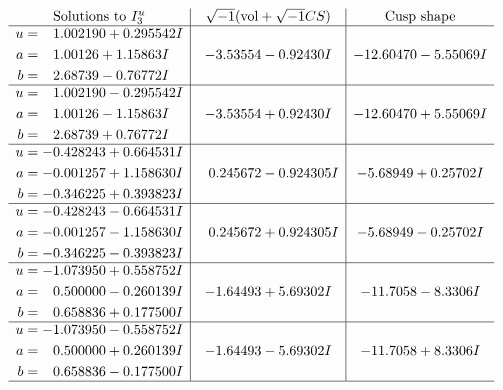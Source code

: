 \documentclass[1p]{elsarticle_modified}
\theoremstyle{definition}
\newcommand{\I}{\sqrt{-1}}
\begin{document}
$$\begin{array}{c|c|c}  
\text{Solutions to }I^u_{3}& \I (\text{vol} + \sqrt{-1}CS) & \text{Cusp shape}\\
 \hline 
\begin{aligned}
u &= \phantom{-}1.002190 + 0.295542 I \\
a &= \phantom{-}1.00126 + 1.15863 I \\
b &= \phantom{-}2.68739 - 0.76772 I\end{aligned}
 & -3.53554 - 0.92430 I & -12.60470 - 5.55069 I \\ \hline\begin{aligned}
u &= \phantom{-}1.002190 - 0.295542 I \\
a &= \phantom{-}1.00126 - 1.15863 I \\
b &= \phantom{-}2.68739 + 0.76772 I\end{aligned}
 & -3.53554 + 0.92430 I & -12.60470 + 5.55069 I \\ \hline\begin{aligned}
u &= -0.428243 + 0.664531 I \\
a &= -0.001257 + 1.158630 I \\
b &= -0.346225 + 0.393823 I\end{aligned}
 & \phantom{-}0.245672 - 0.924305 I & -5.68949 + 0.25702 I \\ \hline\begin{aligned}
u &= -0.428243 - 0.664531 I \\
a &= -0.001257 - 1.158630 I \\
b &= -0.346225 - 0.393823 I\end{aligned}
 & \phantom{-}0.245672 + 0.924305 I & -5.68949 - 0.25702 I \\ \hline\begin{aligned}
u &= -1.073950 + 0.558752 I \\
a &= \phantom{-}0.500000 - 0.260139 I \\
b &= \phantom{-}0.658836 + 0.177500 I\end{aligned}
 & -1.64493 + 5.69302 I & -11.7058 - 8.3306 I \\ \hline\begin{aligned}
u &= -1.073950 - 0.558752 I \\
a &= \phantom{-}0.500000 + 0.260139 I \\
b &= \phantom{-}0.658836 - 0.177500 I\end{aligned}
 & -1.64493 - 5.69302 I & -11.7058 + 8.3306 I\\
 \hline 
 \end{array}$$\newpage
\end{document}
